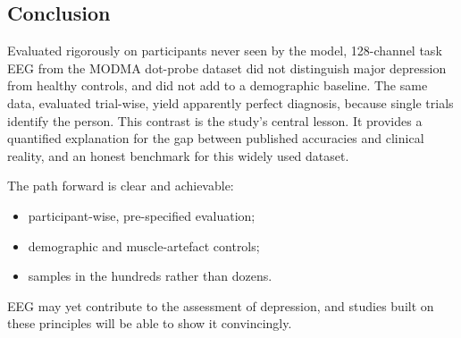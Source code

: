 \subsection{Conclusion}
Evaluated rigorously on participants never seen by the model, 128-channel task EEG from the MODMA dot-probe dataset
did not distinguish major depression from healthy controls, and did not add to a demographic baseline. The same data,
evaluated trial-wise, yield apparently perfect diagnosis, because single trials identify the person. This contrast is
the study's central lesson. It provides a quantified explanation for the gap between published accuracies and
clinical reality, and an honest benchmark for this widely used dataset.

The path forward is clear and achievable:
\begin{itemize}
  \item participant-wise, pre-specified evaluation;
  \item demographic and muscle-artefact controls;
  \item samples in the hundreds rather than dozens.
\end{itemize}
EEG may yet contribute to the assessment of depression, and studies built on these principles will be able to show it
convincingly.
